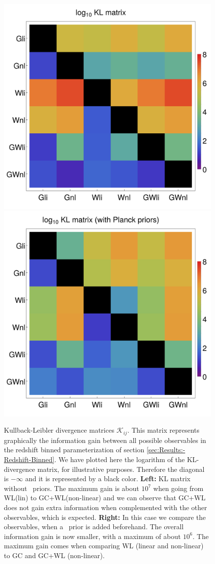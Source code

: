 \begin{figure}[h]
	\centering
	\includegraphics[width=0.47\linewidth]{Chapters/linear-nonlinear-MG-forecasts/figures/KL-divergence/KL-Matrix-all-obs-noPlanck-new}
	\includegraphics[width=0.47\linewidth]{Chapters/linear-nonlinear-MG-forecasts/figures/KL-divergence/KL-Matrix-all-obs-withPlanck-new}
	\caption[Kullback-Leibler divergence matrices for Euclid forecasts.]{Kullback-Leibler divergence matrices $\mathcal{K}_{ij}$. This matrix represents graphically
		the information gain between all possible observables in the redshift
		binned parameterization of section \ref{sec:Results:-Redshift-Binned}. 
		We have plotted here the logarithm of the KL-divergence matrix, for illustrative purposes. 
		Therefore the diagonal is $-\infty$ and it is represented by a black color. 
		\textbf{Left:} KL matrix without \planck\ priors. 
		The maximum gain is about $10^7$ when going from WL(lin) to GC+WL(non-linear) 
		and we can observe that GC+WL does not gain extra information when complemented with the other observables, which is expected.
		\textbf{Right:} In this case we compare the observables, when a \planck\ prior is added beforehand. 
		The overall information gain is now smaller, with a maximum of about $10^6$. 
		The maximum gain comes when comparing WL (linear and non-linear) to GC and GC+WL (non-linear). 
	}
	\label{fig:kl-matrices}
\end{figure}



